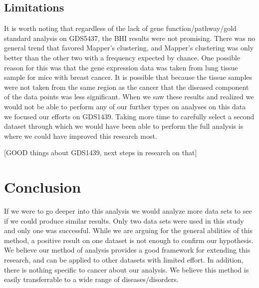\documentclass[preprint,10pt]{elsarticle}
\begin{document}
\subsection{Limitations}
	It is worth noting that regardless of the lack of gene function/pathway/gold standard analysis on GDS5437, the BHI results were not promising. There was no general trend that favored Mapper's clustering, and Mapper's clustering was only better than the other two with a frequency expected by chance. One possible reason for this was that the gene expression data was taken from lung tissue sample for mice with breast cancer. It is possible that because the tissue samples were not taken from the same region as the cancer that the diseased component of the data points was less significant. When we saw these results and realized we would not be able to perform any of our further types on analyses on this data we focused our efforts on GDS1439. Taking more time to carefully select a second dataset through which we would have been able to perform the full analysis is where we could have improved this research most.
	
	[GOOD things about GDS1439, next steps in research on that]


\section{Conclusion}

If we were to go deeper into this analysis we would analyze more data sets to see if we could produce similar results. Only two data sets were used in this study and only one was successful. While we are arguing for the general abilities of this method, a positive result on one dataset is not enough to confirm our hypothesis. We believe our method of analysis provides a good framework for extending this research, and can be applied to other datasets with limited effort. In addition, there is nothing specific to cancer about our analysis. We believe this method is easily transferrable to a wide range of diseases/disorders. 




\end{document}

